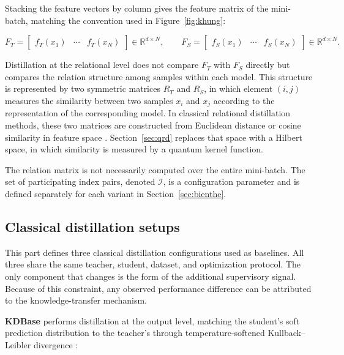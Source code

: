 Stacking the feature vectors by column gives the feature matrix of
the mini-batch, matching the convention used in Figure~\ref{fig:khung}:

\begin{equation}
\label{eq:featmat}
F_T = \begin{bmatrix} f_T(x_1) & \cdots & f_T(x_N) \end{bmatrix}
\in \mathbb{R}^{d \times N},
\qquad
F_S = \begin{bmatrix} f_S(x_1) & \cdots & f_S(x_N) \end{bmatrix}
\in \mathbb{R}^{d \times N}.
\end{equation}

Distillation at the relational level does not compare $F_T$ with
$F_S$ directly but compares the relation structure among samples
within each model. This structure is represented by two symmetric
matrices $R_T$ and $R_S$, in which element $(i,j)$ measures the
similarity between two samples $x_i$ and $x_j$ according to the
representation of the corresponding model. In classical relational
distillation methods, these two matrices are constructed from
Euclidean distance or cosine similarity in feature space
\cite{park2019relational}. Section~\ref{sec:qrd} replaces that space
with a Hilbert space, in which similarity is measured by a quantum
kernel function.

The relation matrix is not necessarily computed over the entire
mini-batch. The set of participating index pairs, denoted
$\mathcal{I}$, is a configuration parameter and is defined
separately for each variant in Section~\ref{sec:bienthe}.

\subsection{Classical distillation setups}
\label{sec:cocdien}

This part defines three classical distillation configurations used
as baselines. All three share the same teacher, student, dataset,
and optimization protocol. The only component that changes is the
form of the additional supervisory signal. Because of this
constraint, any observed performance difference can be attributed to
the knowledge-transfer mechanism.

\textbf{KDBase} performs distillation at the output level, matching
the student's soft prediction distribution to the teacher's through
temperature-softened Kullback--Leibler divergence
\cite{hinton2015distilling}:

